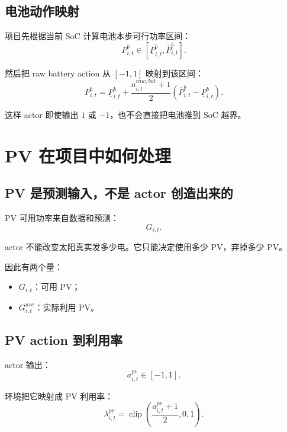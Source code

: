 \documentclass[UTF8,zihao=-4]{ctexart}
\begin{document}
\subsection{电池动作映射}

项目先根据当前 SoC 计算电池本步可行功率区间：
\begin{equation}
P^b_{i,t}\in[\underline P^b_{i,t},\overline P^b_{i,t}].
\end{equation}

然后把 raw battery action 从 $[-1,1]$ 映射到该区间：
\begin{equation}
P^b_{i,t}
=
\underline P^b_{i,t}
+
\frac{a^{raw,bat}_{i,t}+1}{2}
\left(
\overline P^b_{i,t}-\underline P^b_{i,t}
\right).
\end{equation}

这样 actor 即使输出 $1$ 或 $-1$，也不会直接把电池推到 SoC 越界。

\section{PV 在项目中如何处理}

\subsection{PV 是预测输入，不是 actor 创造出来的}

PV 可用功率来自数据和预测：
\begin{equation}
G_{i,t}.
\end{equation}

actor 不能改变太阳真实发多少电。它只能决定使用多少 PV，弃掉多少 PV。

因此有两个量：
\begin{itemize}
  \item $G_{i,t}$：可用 PV；
  \item $G^{use}_{i,t}$：实际利用 PV。
\end{itemize}

\subsection{PV action 到利用率}

actor 输出：
\begin{equation}
a^{pv}_{i,t}\in[-1,1].
\end{equation}

环境把它映射成 PV 利用率：
\begin{equation}
\lambda^{pv}_{i,t}
=
\operatorname{clip}
\left(
\frac{a^{pv}_{i,t}+1}{2},
0,
1
\right).
\end{equation}
\end{document}

